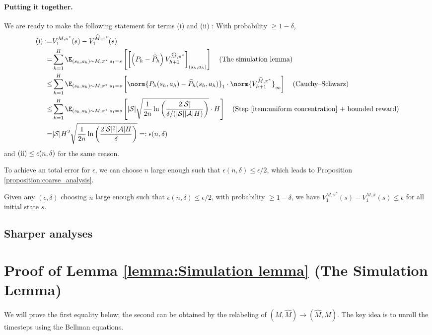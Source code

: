 \paragraph{Putting it together.}
We are ready to make the following statement for terms (i) and (ii) :
With probability $\geq 1-\delta$,
\begin{align*}
    {\rm (i)}:=& V^{M,\pi^*}_1(s) -V^{\widehat{M},\pi^*}_1(s) \\
    =& \sum_{h=1}^H \E_{\left(s_h, a_h\right) \sim M, \pi^* | s_1=s}\left[\left[\left(P_h-\widehat{P}_h\right) V_{h+1}^{\widehat{M}, \pi^*}\right]_{(s_h,a_h)}\right] \quad\text{(The simulation lemma)}\\
    \leq& \sum_{h=1}^H \E_{\left(s_h, a_h\right) \sim M, \pi^* | s_1=s}\left[\norm{{P}_h(s_h, a_h)-\widehat{P}_h(s_h, a_h)}_1 \cdot \norm{V_{h+1}^{\widehat{M}, \pi^*}}_\infty\right] \quad\text{(Cauchy–Schwarz)}\\
    \leq& \sum_{h=1}^H \E_{\left(s_h, a_h\right) \sim M, \pi^* | s_1=s}\left[|\mathcal{S}|  \sqrt{\frac{1}{2 n} \ln \left(\frac{2|\mathcal{S}|}{\delta/(|\mathcal{S}||\mathcal{A}|H)}\right)} \cdot H\right] \quad\text{(Step \ref{item:uniform concentration} + bounded reward)}\\
    =& |\mathcal{S}| H^2  \sqrt{\frac{1}{2 n} \ln \left(\frac{2|\mathcal{S}|^2|\mathcal{A}|H}{\delta}\right)} =: \epsilon(n,\delta)
\end{align*}
and ${\rm (ii)}\leq\epsilon(n,\delta)$ for the same reason.


To achieve an total error for $\epsilon$, we can choose $n$ large enough such that $\epsilon(n,\delta) \leq \epsilon/2$, which leads to Proposition \ref{proposition:coarse_analysis}.
\begin{proposition}
\label{proposition:coarse_analysis}
Given any $(\epsilon,\delta)$ choosing $n$ large enough such that $\epsilon(n,\delta)\leq \epsilon/2$, with probability $\geq 1-\delta$, we have
$V^{M,\pi^*}_1(s) - V^{M,\widehat{\pi}}_1(s) \leq \epsilon$ for all initial state $s$.
\end{proposition}

\subsection{Sharper analyses}

\section{Proof of Lemma \ref{lemma:Simulation lemma} (The Simulation Lemma)}
We will prove the first equality below; the second can be obtained by the relabeling of $(M, \widehat{M})\to(\widehat{M}, M)$.
The key idea is to unroll the timesteps using the Bellman equations.

